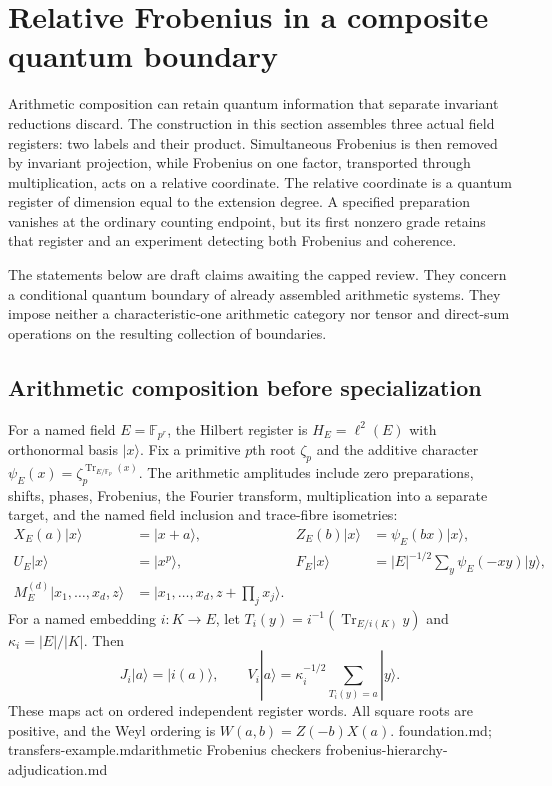 \section{Relative Frobenius in a composite quantum boundary}
\label{sec:composite-relative-boundary}

Arithmetic composition can retain quantum information that separate
invariant reductions discard. The construction in this section assembles
three actual field registers: two labels and their product. Simultaneous
Frobenius is then removed by invariant projection, while Frobenius on one
factor, transported through multiplication, acts on a relative coordinate.
The relative coordinate is a quantum register of dimension equal to the
extension degree. A specified preparation vanishes at the ordinary
counting endpoint, but its first nonzero grade retains that register and
an experiment detecting both Frobenius and coherence.

The statements below are draft claims awaiting the capped review. They
concern a conditional quantum boundary of already assembled arithmetic
systems. They impose neither a characteristic-one arithmetic category nor
tensor and direct-sum operations on the resulting collection of boundaries.

\subsection{Arithmetic composition before specialization}

For a named field $E=\mathbb F_{p^r}$, the Hilbert register is
$H_E=\ell^2(E)$ with orthonormal basis $|x\rangle$. Fix a primitive
$p$th root $\zeta_p$ and the additive character
$\psi_E(x)=\zeta_p^{\operatorname{Tr}_{E/\mathbb F_p}(x)}$.
The arithmetic amplitudes include zero preparations, shifts, phases,
Frobenius, the Fourier transform, multiplication into a separate target,
and the named field inclusion and trace-fibre isometries:
\begin{align*}
 X_E(a)|x\rangle&=|x+a\rangle,&
 Z_E(b)|x\rangle&=\psi_E(bx)|x\rangle,\\
 U_E|x\rangle&=|x^p\rangle,&
 F_E|x\rangle&=|E|^{-1/2}\sum_y\psi_E(-xy)|y\rangle,\\
 M_E^{(d)}|x_1,\ldots,x_d,z\rangle
 &=|x_1,\ldots,x_d,z+\prod_jx_j\rangle.
\end{align*}
For a named embedding $i:K\to E$, let
$T_i(y)=i^{-1}(\operatorname{Tr}_{E/i(K)}y)$ and
$\kappa_i=|E|/|K|$. Then
\[
 J_i|a\rangle=|i(a)\rangle,\qquad
 V_i|a\rangle=\kappa_i^{-1/2}\sum_{T_i(y)=a}|y\rangle.
\]
These maps act on ordered independent register words. All square roots
are positive, and the Weyl ordering is $W(a,b)=Z(-b)X(a)$.
{foundation.md; transfers-example.md}{arithmetic Frobenius checkers}
{frobenius-hierarchy-adjudication.md}

